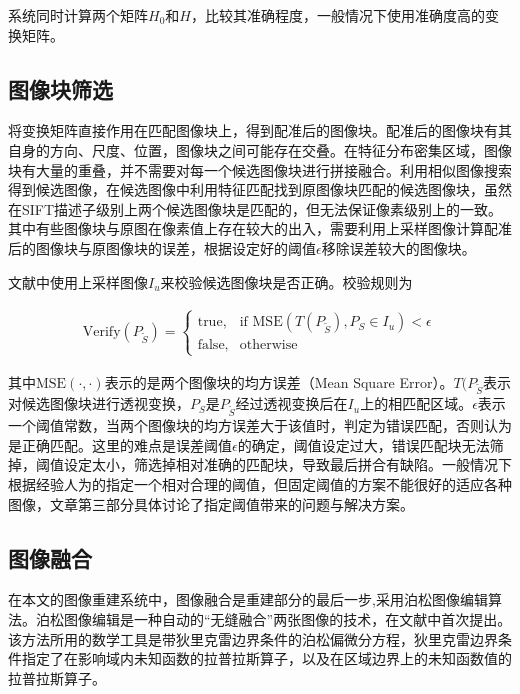 \documentclass[UTF8]{csoarticle}
\begin{document}
系统同时计算两个矩阵\(H_0\)和\(H\)，比较其准确程度，一般情况下使用准确度高的变换矩阵。%

\subsection{图像块筛选}
将变换矩阵直接作用在匹配图像块上，得到配准后的图像块。配准后的图像块有其自身的方向、尺度、位置，图像块之间可能存在交叠。在特征分布密集区域，图像块有大量的重叠，并不需要对每一个候选图像块进行拼接融合。利用相似图像搜索得到候选图像，在候选图像中利用特征匹配找到原图像块匹配的候选图像块，虽然在SIFT描述子级别上两个候选图像块是匹配的，但无法保证像素级别上的一致。其中有些图像块与原图在像素值上存在较大的出入，需要利用上采样图像计算配准后的图像块与原图像块的误差，根据设定好的阈值\(\epsilon\)移除误差较大的图像块。

文献\cite{Dai:2012vn}中使用上采样图像\(I_u\)来校验候选图像块是否正确。校验规则为

\begin{align}
\label{eq:errorControl}
  \text{Verify}(P_{\tilde{S}}) = 
\begin{cases} 
\text{true}, & \mbox{if MSE} (T(P_{\tilde{S}}),P_S \in I_u) < \epsilon \\
\text{false}, & \mbox{otherwise}
\end{cases}
\end{align}

其中\(\text{MSE}(\cdot,\cdot)\)表示的是两个图像块的均方误差（Mean Square Error）。\(T(P_{\tilde{S}}\)表示对候选图像块进行透视变换，\(P_{S}\)是\(P_{\tilde{S}}\)经过透视变换后在\(I_u\)上的相匹配区域。\(\epsilon\)表示一个阈值常数，当两个图像块的均方误差大于该值时，判定为错误匹配，否则认为是正确匹配。这里的难点是误差阈值\(\epsilon\)的确定，阈值设定过大，错误匹配块无法筛掉，阈值设定太小，筛选掉相对准确的匹配块，导致最后拼合有缺陷。一般情况下根据经验人为的指定一个相对合理的阈值，但固定阈值的方案不能很好的适应各种图像，文章第三部分具体讨论了指定阈值带来的问题与解决方案。

\subsection{图像融合}
在本文的图像重建系统中，图像融合是重建部分的最后一步,采用泊松图像编辑算法。泊松图像编辑是一种自动的“无缝融合”两张图像的技术，在文献\cite{Perez:2003ul}中首次提出。该方法所用的数学工具是带狄里克雷边界条件的泊松偏微分方程，狄里克雷边界条件指定了在影响域内未知函数的拉普拉斯算子，以及在区域边界上的未知函数值的拉普拉斯算子。
\end{document}
